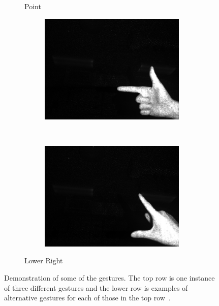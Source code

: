 \begin{figure}
\begin{subfigure}[b]{0.33\columnwidth}
    \caption{Point}
\end{subfigure}%
\begin{subfigure}[b]{0.33\columnwidth}
    \centering
    \begin{subfigure}[b]{\columnwidth}
    \centering
    \includegraphics[width=0.98\columnwidth]{ch5/figs/lower_right_1.png}
    \end{subfigure}
    \\
    \vspace{1pt}
    \begin{subfigure}[b]{\columnwidth}
    \centering
    \includegraphics[width=0.98\columnwidth]{ch5/figs/lower_right_2.png}
    \end{subfigure}
    \caption{Lower Right}
\end{subfigure}
\caption{Demonstration of some of the gestures. The top row is one
instance of three different gestures and the lower row is examples
of alternative gestures for each of those in the top row~\cite{lo2013augmediated}.}
\label{gesture_data}
\end{figure}
